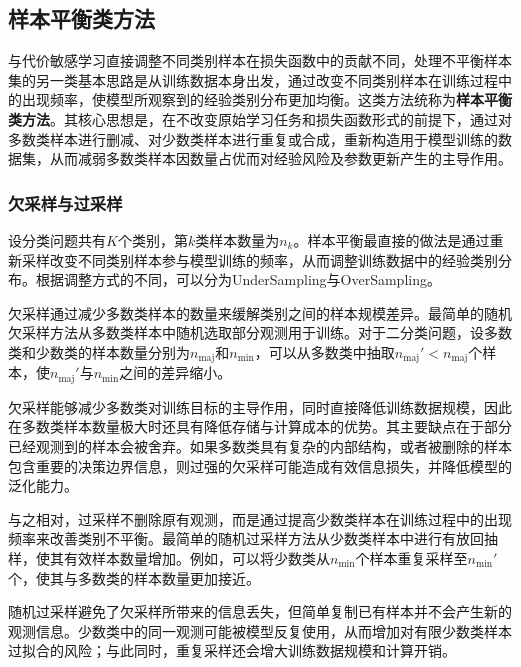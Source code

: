\subsection{样本平衡类方法}
与代价敏感学习直接调整不同类别样本在损失函数中的贡献不同，处理不平衡样本集的另一类基本思路是从训练数据本身出发，通过改变不同类别样本在训练过程中的出现频率，使模型所观察到的经验类别分布更加均衡。这类方法统称为\textbf{样本平衡类方法}。其核心思想是，在不改变原始学习任务和损失函数形式的前提下，通过对多数类样本进行删减、对少数类样本进行重复或合成，重新构造用于模型训练的数据集，从而减弱多数类样本因数量占优而对经验风险及参数更新产生的主导作用。
\subsubsection{欠采样与过采样}
设分类问题共有$K$个类别，第$k$类样本数量为$n_k$。样本平衡最直接的做法是通过重新采样改变不同类别样本参与模型训练的频率，从而调整训练数据中的经验类别分布。根据调整方式的不同，可以分为\gls{UnderSampling}与\gls{OverSampling}。\par
欠采样通过减少多数类样本的数量来缓解类别之间的样本规模差异。最简单的随机欠采样方法从多数类样本中随机选取部分观测用于训练。对于二分类问题，设多数类和少数类的样本数量分别为$n_{\mathrm{maj}}$和$n_{\mathrm{min}}$，可以从多数类中抽取$n_{\mathrm{maj}}'<n_{\mathrm{maj}}$个样本，使$n_{\mathrm{maj}}'$与$n_{\mathrm{min}}$之间的差异缩小。\par
欠采样能够减少多数类对训练目标的主导作用，同时直接降低训练数据规模，因此在多数类样本数量极大时还具有降低存储与计算成本的优势。其主要缺点在于部分已经观测到的样本会被舍弃。如果多数类具有复杂的内部结构，或者被删除的样本包含重要的决策边界信息，则过强的欠采样可能造成有效信息损失，并降低模型的泛化能力。\par
与之相对，过采样不删除原有观测，而是通过提高少数类样本在训练过程中的出现频率来改善类别不平衡。最简单的随机过采样方法从少数类样本中进行有放回抽样，使其有效样本数量增加。例如，可以将少数类从$n_{\mathrm{min}}$个样本重复采样至$n_{\mathrm{min}}'$个，使其与多数类的样本数量更加接近。\par
随机过采样避免了欠采样所带来的信息丢失，但简单复制已有样本并不会产生新的观测信息。少数类中的同一观测可能被模型反复使用，从而增加对有限少数类样本过拟合的风险；与此同时，重复采样还会增大训练数据规模和计算开销。
